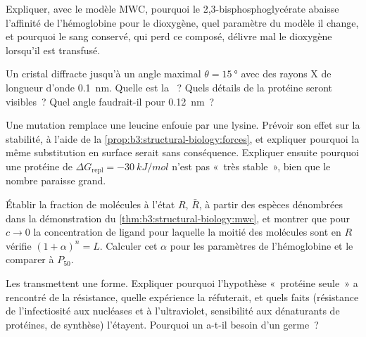 \begin{exercise}[$\star\star$]\label{exo:b3:structural-biology:7}
Expliquer, avec le modèle MWC, pourquoi le 2,3-bisphosphoglycérate
abaisse l'affinité de l'hémoglobine pour le dioxygène, quel paramètre
du modèle il change, et pourquoi le sang conservé, qui perd ce composé,
délivre mal le dioxygène lorsqu'il est transfusé.
\end{exercise}

\begin{exercise}[$\star\star$]\label{exo:b3:structural-biology:8}
Un cristal diffracte jusqu'à un angle maximal
$\theta = \qty{15}{\degree}$ avec des rayons X de longueur d'onde
\qty{0.1}{nm}. Quelle est la ~? Quels détails de la protéine
seront visibles~? Quel angle faudrait-il pour \qty{0.12}{nm}~?
\end{exercise}

\begin{exercise}[$\star\star$]\label{exo:b3:structural-biology:9}
Une mutation remplace une leucine enfouie par une lysine. Prévoir son
effet sur la stabilité, à l'aide de la
\cref{prop:b3:structural-biology:forces}, et expliquer pourquoi la même
substitution en surface serait sans conséquence. Expliquer ensuite
pourquoi une protéine de $\Delta G_{\text{repl}} =
\qty{-30}{kJ/mol}$ n'est pas «~très stable~», bien que le nombre
paraisse grand.
\end{exercise}

\begin{exercise}[$\star\star\star$]\label{exo:b3:structural-biology:10}
Établir la fraction de molécules à l'état $R$, $\bar R$, à partir des
espèces dénombrées dans la démonstration du
\cref{thm:b3:structural-biology:mwc}, et montrer que pour $c \to 0$ la
concentration de ligand pour laquelle la moitié des molécules sont en
$R$ vérifie $(1+\alpha)^{n} = L$. Calculer cet $\alpha$ pour les
paramètres de l'hémoglobine et le comparer à $P_{50}$.
\end{exercise}

\begin{exercise}[$\star\star\star$]\label{exo:b3:structural-biology:11}
Les  transmettent une forme. Expliquer pourquoi l'hypothèse
«~protéine seule~» a rencontré de la résistance, quelle expérience la
réfuterait, et quels faits (résistance de l'infectiosité aux nucléases
et à l'ultraviolet, sensibilité aux dénaturants de protéines,  de
synthèse) l'étayent. Pourquoi un  a-t-il besoin d'un germe~?
\end{exercise}

